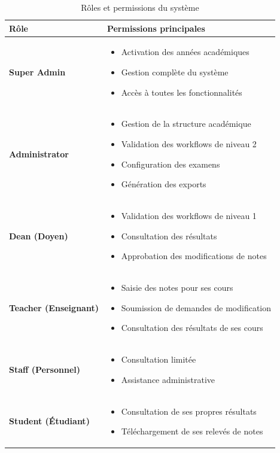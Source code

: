 \begin{table}[h]
\centering
\begin{tabular}{|l|p{10cm}|}
\hline
\textbf{Rôle} & \textbf{Permissions principales} \\
\hline
\textbf{Super Admin} &
\begin{itemize}[leftmargin=*,topsep=0pt,partopsep=0pt,itemsep=0pt]
    \item Activation des années académiques
    \item Gestion complète du système
    \item Accès à toutes les fonctionnalités
\end{itemize} \\
\hline
\textbf{Administrator} &
\begin{itemize}[leftmargin=*,topsep=0pt,partopsep=0pt,itemsep=0pt]
    \item Gestion de la structure académique
    \item Validation des workflows de niveau 2
    \item Configuration des examens
    \item Génération des exports
\end{itemize} \\
\hline
\textbf{Dean (Doyen)} &
\begin{itemize}[leftmargin=*,topsep=0pt,partopsep=0pt,itemsep=0pt]
    \item Validation des workflows de niveau 1
    \item Consultation des résultats
    \item Approbation des modifications de notes
\end{itemize} \\
\hline
\textbf{Teacher (Enseignant)} &
\begin{itemize}[leftmargin=*,topsep=0pt,partopsep=0pt,itemsep=0pt]
    \item Saisie des notes pour ses cours
    \item Soumission de demandes de modification
    \item Consultation des résultats de ses cours
\end{itemize} \\
\hline
\textbf{Staff (Personnel)} &
\begin{itemize}[leftmargin=*,topsep=0pt,partopsep=0pt,itemsep=0pt]
    \item Consultation limitée
    \item Assistance administrative
\end{itemize} \\
\hline
\textbf{Student (Étudiant)} &
\begin{itemize}[leftmargin=*,topsep=0pt,partopsep=0pt,itemsep=0pt]
    \item Consultation de ses propres résultats
    \item Téléchargement de ses relevés de notes
\end{itemize} \\
\hline
\end{tabular}
\caption{Rôles et permissions du système}
\end{table}

